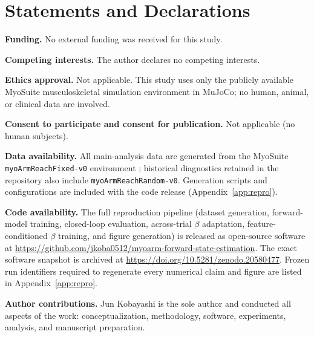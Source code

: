 \documentclass[sn-mathphys,NameDate,iicol]{sn-jnl}
\begin{document}
\section*{Statements and Declarations}

\noindent\textbf{Funding.} No external funding was received for this
study.

\noindent\textbf{Competing interests.} The author declares no
competing interests.

\noindent\textbf{Ethics approval.} Not applicable. This study uses
only the publicly available MyoSuite musculoskeletal simulation
environment in MuJoCo; no human, animal, or clinical data are
involved.

\noindent\textbf{Consent to participate and consent for publication.}
Not applicable (no human subjects).

\noindent\textbf{Data availability.} All main-analysis data are
generated from the MyoSuite \texttt{myoArmReachFixed-v0} environment
\cite{caggiano2022myosuite}; historical diagnostics retained in the
repository also include \texttt{myoArmReachRandom-v0}. Generation
scripts and configurations are included with the code release
(Appendix~\ref{app:repro}).

\noindent\textbf{Code availability.} The full reproduction pipeline
(dataset generation, forward-model training, closed-loop evaluation,
across-trial $\beta$ adaptation, feature-conditioned $\beta$
training, and figure generation) is released as open-source
software at
\url{https://github.com/jkoba0512/myoarm-forward-state-estimation}.
The exact software snapshot is archived at
\url{https://doi.org/10.5281/zenodo.20580477}. Frozen run identifiers required
to regenerate every numerical claim and figure are listed in
Appendix~\ref{app:repro}.

\noindent\textbf{Author contributions.} Jun Kobayashi is the sole
author and conducted all aspects of the work: conceptualization,
methodology, software, experiments, analysis, and manuscript
preparation.
\end{document}
